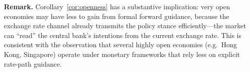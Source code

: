\noindent\textbf{Remark.} Corollary~\ref{cor:openness} has a substantive implication:
very open economies may have less to gain from formal forward guidance, because the
exchange rate channel already transmits the policy stance efficiently---the market can
``read'' the central bank's intentions from the current exchange rate. This is
consistent with the observation that several highly open economies (e.g.\ Hong Kong,
Singapore) operate under monetary frameworks that rely less on explicit rate-path
guidance.
